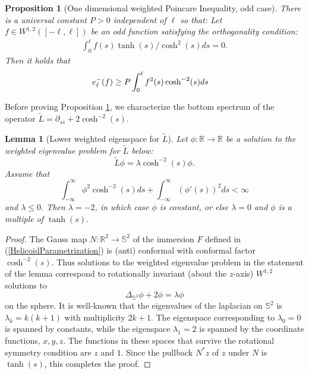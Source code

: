 \documentclass{amsart}
\newtheorem{lemma}{Lemma}
\newtheorem{proposition}{Proposition}
\newcommand{\mb}{\mathbb}
\newcommand{\wt}{\widetilde}
\begin{document}
\begin{proposition}[One dimensional weighted Poincare Inequality, odd case] \label{PoincareInequality}
There is a universal constant  $P > 0$ independent of $\ell$ so that: Let $f \in W^{1, 2}([-\ell, \ell])$  be an odd function satisfying the orthogonality condition:
\begin{align} \label{WeightedOrthogonalityCondition}
\int_0^\ell f (s)\tanh(s)/\cosh^2(s) ds = 0.
\end{align}
Then it holds that 
\begin{align} \notag
e^{-}_\ell(f) & \geq P \int_0^\ell f^2(s) \cosh^{-2} (s)ds
\end{align}
\end{proposition}

Before  proving Proposition \ref{PoincareInequality}, we characterize  the bottom spectrum of the operator $\wt{L} = \partial_{ss} + 2 \cosh^{-2}(s)$.

\begin{lemma}[Lower weighted eigenspace for $\wt{L}$]\label{LEigenvalues}
Let $\phi: \mb{R} \rightarrow \mb{R}$ be a solution to the weighted eigenvalue problem for $\wt{L}$ below:
\[
\wt{L} \phi = \lambda \cosh^{-2}(s)\phi.
\]
Assume that 
\[
\int_{-\infty}^\infty \phi^2 \cosh^{-2}(s) ds + \int_{-\infty}^\infty \left(\phi'(s)\right)^2 ds < \infty
\]
and   $\lambda \leq 0$. Then $\lambda = -2$, in which case $\phi$ is  constant, or else $\lambda = 0$ and $\phi$ is a multiple of $\tanh(s)$. 
 \end{lemma}
 
 \begin{proof}
 The Gauss map $N: \mb{R}^2 \rightarrow \mb{S}^2$ of the immersion $F$ defined in (\ref{HelicoidParametrization}) is (anti) conformal with conformal factor $\cosh^{-2}(s)$. Thus solutions to the weighted eigenvalue problem in the statement of the lemma correspond to rotationally invariant (about the $z$-axis) $W^{1,2 }$ solutions to 
 \[
 \Delta_{\mb{S}^2} \phi + 2 \phi = \lambda \phi
 \]
 on the sphere.  It is well-known that the eigenvalues  of the laplacian on $\mb{S}^2$ is $\lambda_{k} = k(k + 1)$ with multiplicity $2k + 1$. The eigenspace corresponding to $\lambda_0 = 0$ is spanned by constants, while the eigenspace $\lambda_1 = 2$ is spanned by the coordinate functions, $x, y, z$. The functions in these spaces that survive the rotational symmetry condition are $z$ and $1$. Since the pullback $N^* z$  of $z$ under $N$ is $\tanh(s)$, this completes the proof. 
  \end{proof}
\end{document}
